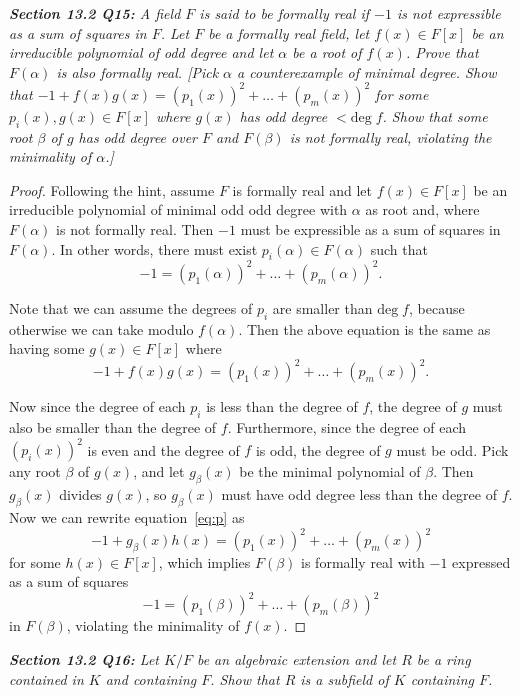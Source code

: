 \documentclass{article}
\begin{document}
\it \textbf{Section 13.2 Q15:} A field $F$ is said to be formally real if
  $-1$ is not expressible as a sum of squares in $F$. Let $F$ be a formally
  real field, let $f(x)\in F[x]$ be an irreducible polynomial of odd degree
  and let $\alpha$ be a root of $f(x)$. Prove that $F(\alpha)$ is also
  formally real. [Pick $\alpha$ a counterexample of minimal degree. Show
  that $-1+f(x)g(x) =(p_1(x))^2 +\ldots +(p_m(x))^2$ for some
  $p_i(x),g(x)\in F[x]$ where $g(x)$ has odd degree $<\text{deg}\; f$. Show
  that some root $\beta$ of $g$ has odd degree over $F$ and $F(\beta)$ is
  not formally real, violating the minimality of $\alpha$.] 

  \begin{proof}
    Following the hint, assume $F$ is formally real and let $f(x)\in F[x]$
    be an irreducible polynomial of minimal odd odd degree with $\alpha$ as
    root and, where $F(\alpha)$ is not formally real. Then $-1$ must be
    expressible as a sum of squares in $F(\alpha)$. In other words, there
    must exist $p_i(\alpha)\in F(\alpha)$ such that
    \[-1 =(p_1(\alpha))^2 +\ldots +(p_m(\alpha))^2.\]

    Note that we can assume the degrees of $p_i$ are smaller than
    $\text{deg}\; f$, because otherwise we can take modulo $f(\alpha)$.
    Then the above equation is the same as having some $g(x)\in F[x]$ where
    \begin{equation}
      -1+f(x)g(x) =(p_1(x))^2 +\ldots +(p_m(x))^2.
      \label{eq:p}
    \end{equation}

    Now since the degree of each $p_i$ is less than the degree of $f$, the
    degree of $g$ must also be smaller than the degree of $f$. Furthermore,
    since the degree of each $(p_i(x))^2$ is even and the degree of $f$ is
    odd, the degree of $g$ must be odd. Pick any root $\beta$ of $g(x)$,
    and let $g_\beta(x)$ be the minimal polynomial of $\beta$. Then
    $g_\beta(x)$ divides $g(x)$, so $g_\beta(x)$ must
    have odd degree less than the degree of $f$. Now we can rewrite
    equation~\ref{eq:p} as
    \[-1+g_\beta(x)h(x) =(p_1(x))^2 +\ldots +(p_m(x))^2\]
    for some $h(x)\in F[x]$, which implies $F(\beta)$ is formally real with
    $-1$ expressed as a sum of squares
    \[-1 =(p_1(\beta))^2 +\ldots +(p_m(\beta))^2\]
    in $F(\beta)$, violating the minimality of $f(x)$.
  \end{proof}

\it \textbf{Section 13.2 Q16:} Let $K/F$ be an algebraic extension and let
  $R$ be a ring contained in $K$ and containing $F$. Show that $R$ is a
  subfield of $K$ containing $F$.
\end{document}
